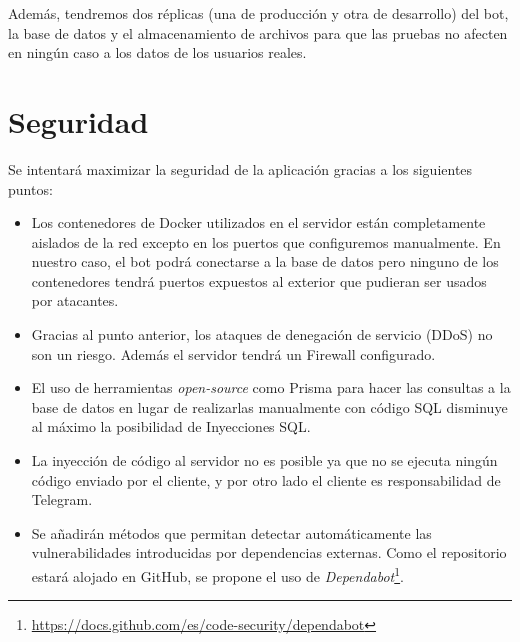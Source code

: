 Además, tendremos dos réplicas (una de producción y otra de desarrollo) del bot, la base de datos y el almacenamiento de archivos para que las pruebas no afecten en ningún caso a los datos de los usuarios reales.

\section{Seguridad}

Se intentará maximizar la seguridad de la aplicación gracias a los siguientes puntos:

\begin{itemize}
    \item Los contenedores de Docker utilizados en el servidor están completamente aislados de la red excepto en los puertos que configuremos manualmente. En nuestro caso, el bot podrá conectarse a la base de datos pero ninguno de los contenedores tendrá puertos expuestos al exterior que pudieran ser usados por atacantes.
    \item Gracias al punto anterior, los ataques de denegación de servicio (DDoS) no son un riesgo. Además el servidor tendrá un Firewall configurado.
    \item El uso de herramientas \textit{open-source} como Prisma para hacer las consultas a la base de datos en lugar de realizarlas manualmente con código SQL disminuye al máximo la posibilidad de Inyecciones SQL.
    \item La inyección de código al servidor no es posible ya que no se ejecuta ningún código enviado por el cliente, y por otro lado el cliente es responsabilidad de Telegram.
    \item Se añadirán métodos que permitan detectar automáticamente las vulnerabilidades introducidas por dependencias externas. Como el repositorio estará alojado en GitHub, se propone el uso de \textit{Dependabot}\footnote{\url{https://docs.github.com/es/code-security/dependabot}}.
\end{itemize}




